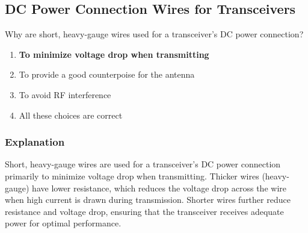 \subsection{DC Power Connection Wires for Transceivers}
\label{T4A03}

\begin{tcolorbox}[colback=gray!10!white,colframe=black!75!black,title=T4A03]
Why are short, heavy-gauge wires used for a transceiver’s DC power connection?
\begin{enumerate}[noitemsep]
    \item \textbf{To minimize voltage drop when transmitting}
    \item To provide a good counterpoise for the antenna
    \item To avoid RF interference
    \item All these choices are correct
\end{enumerate}
\end{tcolorbox}

\subsubsection*{Explanation}
Short, heavy-gauge wires are used for a transceiver’s DC power connection primarily to minimize voltage drop when transmitting. Thicker wires (heavy-gauge) have lower resistance, which reduces the voltage drop across the wire when high current is drawn during transmission. Shorter wires further reduce resistance and voltage drop, ensuring that the transceiver receives adequate power for optimal performance.